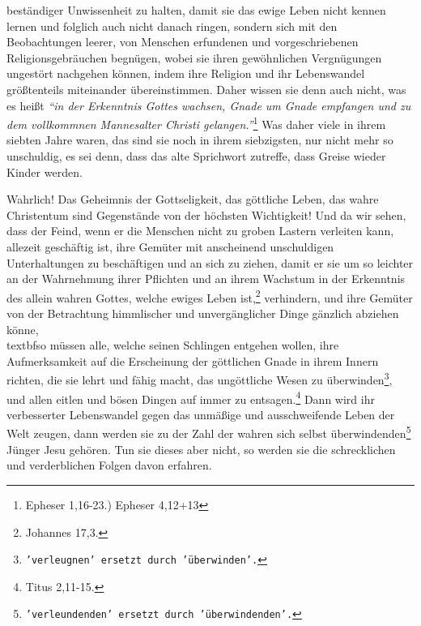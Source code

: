 {beständiger Unwissenheit zu halten, damit sie das ewige Leben nicht kennen
lernen und folglich auch nicht danach ringen, sondern sich mit den
Beobachtungen leerer, von Menschen erfundenen und vorgeschriebenen
Religionsgebräuchen begnügen, wobei sie ihren gewöhnlichen Vergnügungen
ungestört nachgehen können, indem ihre Religion und ihr Lebenswandel
größtenteils miteinander übereinstimmen. Daher wissen sie denn auch nicht, was
es heißt
\textit{"`in der Erkenntnis Gottes wachsen, Gnade um Gnade empfangen und zu
dem vollkommnen Mannesalter Christi gelangen."'}\footnote{Epheser 1,16-23.)
Epheser 4,12+13}
Was daher viele in ihrem siebten Jahre waren, das sind sie noch in
ihrem siebzigsten, nur nicht mehr so unschuldig, es sei denn, dass das alte
Sprichwort zutreffe, dass Greise wieder Kinder werden.

\medskip

Wahrlich! Das Geheimnis der Gottseligkeit, das göttliche
Leben, das wahre
Christentum sind Gegenstände von der höchsten Wichtigkeit! Und da wir sehen,
dass der Feind, wenn er die Menschen nicht zu groben Lastern verleiten kann,
allezeit geschäftig ist, ihre Gemüter mit anscheinend unschuldigen
Unterhaltungen zu beschäftigen und an sich zu ziehen, damit er sie um so
leichter an der Wahrnehmung ihrer Pflichten und an ihrem Wachstum in der
Erkenntnis des allein wahren Gottes, welche ewiges Leben ist,\footnote{Johannes
17,3.}
verhindern, und ihre Gemüter von der Betrachtung himmlischer und
unvergänglicher Dinge gänzlich abziehen könne,\\textbf{so müssen alle, welche
seinen
Schlingen entgehen wollen, ihre Aufmerksamkeit auf die Erscheinung der
göttlichen Gnade in ihrem Innern richten, die sie lehrt und fähig
macht, das
ungöttliche Wesen zu überwinden\footnote{\texttt{'verleugnen' ersetzt durch
'überwinden'.}}, und allen eitlen
und bösen Dingen auf immer zu
entsagen.}\footnote{Titus 2,11-15.}
Dann wird ihr verbesserter Lebenswandel gegen
das unmäßige und ausschweifende Leben der Welt zeugen, dann werden sie zu der
Zahl der wahren sich selbst überwindenden\footnote{\texttt{'verleundenden'
ersetzt durch 'überwindenden'.}} Jünger Jesu
gehören. Tun sie dieses
aber nicht, so werden sie die schrecklichen und verderblichen Folgen davon
erfahren.

\medskip

}
